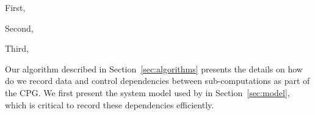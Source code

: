 First, 

Second,

Third,
 




%
%




Our algorithm described in Section~\ref{sec:algorithms} presents the details on how do we record data and control dependencies between sub-computations as part of the CPG. We first present the system model used by \projecttitle in Section~\ref{sec:model}, which is critical to record these dependencies efficiently.














 